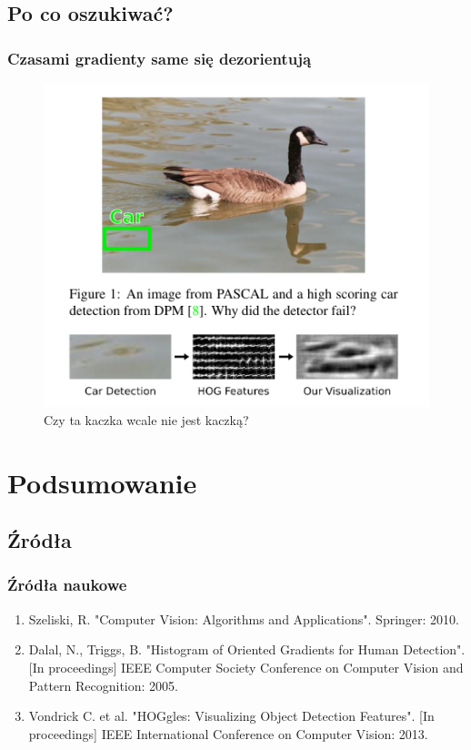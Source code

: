 \documentclass{beamer}
\begin{document}
        \subsection{Po co oszukiwać?}
            \begin{frame}
                \frametitle{Czasami gradienty same się dezorientują}
                \begin{center}
                    \begin{figure}
                        \includegraphics[height=0.8\textheight]{pictures/vondrick_duck.png}
                        \caption{Czy ta kaczka wcale nie jest kaczką?}    
                    \end{figure}
                \end{center}
            \end{frame}


    \section{Podsumowanie}

        \subsection{Źródła}
            \begin{frame}
                \frametitle{Źródła naukowe}
                \begin{enumerate}
                    \item Szeliski, R. "Computer Vision: Algorithms and Applications". Springer: 2010.
                    \item Dalal, N., Triggs, B. "Histogram of Oriented Gradients for Human Detection". [In proceedings] IEEE Computer Society Conference on Computer Vision and Pattern Recognition: 2005.
                    \item Vondrick C. et al. "HOGgles: Visualizing Object Detection Features". [In proceedings] IEEE International Conference on Computer Vision: 2013.
                \end{enumerate}
            \end{frame}
\end{document}
